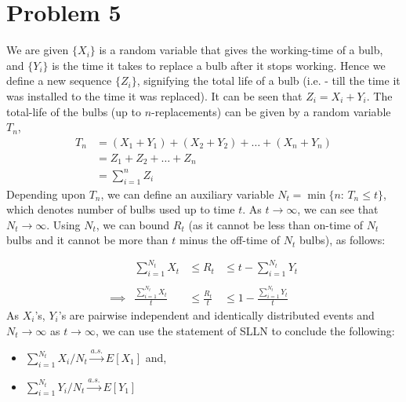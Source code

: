 \documentclass{article}
\begin{document}
\section{Problem 5}
We are given $\{X_i\}$ is a random variable that gives the working-time of a bulb, and $\{Y_i\}$ is the time it takes to replace a bulb after it stops working. Hence we define a new sequence $\{Z_i\}$, signifying the total life of a bulb (i.e. - till the time it was installed to the time it was replaced). It can be seen that $Z_i = X_i + Y_i$. The total-life of the bulbs (up to $n$-replacements) can be given by a random variable $T_n$, 
\begin{equation}
    \label{G15}
    \begin{split}
        T_n &= (X_1 + Y_1) + (X_2 + Y_2) + \dots + (X_n + Y_n) \\
        &= Z_1 + Z_2 + \dots + Z_n\\
        &= \sum_{i=1}^{n} Z_i
    \end{split}
\end{equation}
Depending upon $T_n$, we can define an auxiliary variable $N_t = \min \{n : \, T_n \leq t\}$, which denotes number of bulbs used up to time $t$. As $t\rightarrow\infty$, we can see that $N_t \rightarrow \infty$. Using $N_t$, we can bound $R_t$ (as it cannot be less than on-time of $N_t$ bulbs and it cannot be more than $t$ minus the off-time of $N_t$ bulbs), as follows: 
\begin{equation}
    \label{G16}
    \begin{array}{crlr}
        &&&\\\\
        & \sum_{i=1}^{N_t} X_t &\leq R_t &\leq t - \sum_{i=1}^{N_t} Y_t \\\\
        \implies&  \frac{\sum_{i=1}^{N_t} X_t}{t} &\leq \frac{R_t}{t} &\leq 1 - \frac{\sum_{i=1}^{N_t} Y_t}{t}
    \end{array}
\end{equation}
As $X_i$'s, $Y_i$'s are pairwise independent and identically distributed events and $N_t \rightarrow \infty$ as $t\rightarrow \infty$, we can use the statement of SLLN \cite{10.5555/1869916} to conclude the following: 
\begin{itemize}
    \item $\sum_{i=1}^{N_t} X_i / N_t \xrightarrow{a.s.} E[X_1]$ and, 
    \item $\sum_{i=1}^{N_t} Y_i / N_t \xrightarrow{a.s.} E[Y_1]$
\end{itemize}
\end{document}

